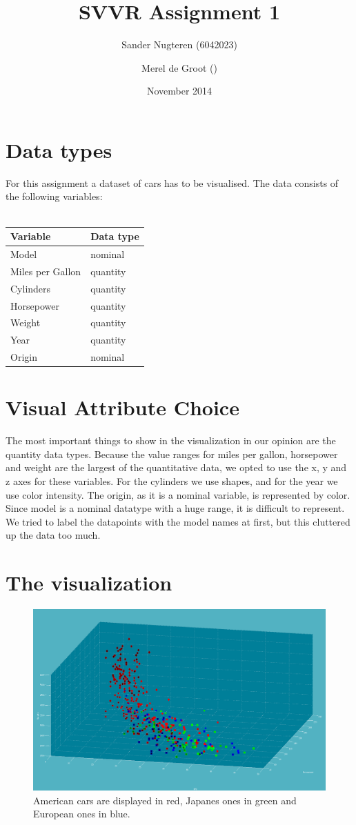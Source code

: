 \documentclass{article}
\title{SVVR Assignment 1}
\author{Sander Nugteren (6042023) \and Merel de Groot ()}
\date{November 2014}
\begin{document}
\section{Data types}
For this assignment a dataset of cars has to be visualised. The data consists
of the following variables:\\\\
\begin{tabular}{|l|l|}
	\hline
	Variable & Data type \\
	\hline
	Model & nominal \\
	Miles per Gallon & quantity \\
	Cylinders & quantity \\
	Horsepower & quantity \\
	Weight & quantity \\
	Year & quantity \\
	Origin & nominal\\
	\hline
\end{tabular}

\section{Visual Attribute Choice}
The most important things to show in the visualization in our opinion are the
quantity data types. Because the value ranges for miles per gallon, horsepower and
weight are the largest of the quantitative data, we opted to
use the x, y and z axes for these variables. For the cylinders we use shapes,
and for the year we use color intensity. The origin, as it is a nominal
variable, is represented by color. Since model is a nominal datatype with a
huge range, it is difficult to represent. We tried to label the datapoints with
the model names at first, but this cluttered up the data too much.

\section{The visualization}

\begin{figure}
	\includegraphics{scivis_plot}
	\caption{American cars are displayed in red, Japanes ones in green and
	European ones in blue.}
\end{figure}
\end{document}
